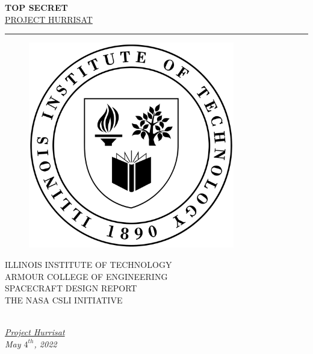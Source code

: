 \documentclass{report}
\newcommand{\HRule}{\rule{\linewidth}{0.4mm}}
\begin{document}
\begin{center}
\textbf{\color{white}TOP SECRET}\\[.2in]
\Large\textsc{\href{https://github.com/eyobghiday/project-hurrisat}{PROJECT HURRISAT}}
\HRule
\vspace{2.2cm}
\end{center}
\begin{figure}[h]
\centering
\includegraphics[width=9cm]{Images/iit_logo.png}\\[.3in]
\end{figure}
\begin{center}
\begin{center}
  \large{ILLINOIS INSTITUTE OF TECHNOLOGY}\\
  \small{ARMOUR COLLEGE OF ENGINEERING}\\
    \small{SPACECRAFT DESIGN REPORT}\\  
    THE NASA CSLI INITIATIVE\\\\[.5in]
\end{center}
\begin{center}
\textit{\href{https://github.com/eyobghiday/project-hurrisat}{ Project Hurrisat}}\\
\textit{May $4^{th}$, 2022}
\end{center}
\end{center}
\end{document}
